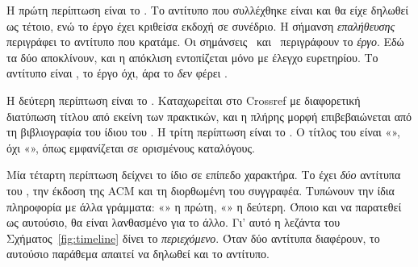 Η πρώτη περίπτωση είναι το \cite{berger2023simulation}. Το αντίτυπο που
συλλέχθηκε είναι  και θα είχε δηλωθεί ως τέτοιο, ενώ το έργο
έχει κριθείσα εκδοχή σε συνέδριο. Η σήμανση \emph{επαλήθευσης} περιγράφει
το αντίτυπο που κρατάμε. Οι σημάνσεις \prep\ και \grey\ περιγράφουν το
\emph{έργο}. Εδώ τα δύο αποκλίνουν, και η απόκλιση εντοπίζεται μόνο με
έλεγχο ευρετηρίου. Το αντίτυπο είναι , το έργο όχι, άρα το
\cite{berger2023simulation} \emph{δεν} φέρει \prep.

Η δεύτερη περίπτωση είναι το \cite{oki1988viewstamped}. Καταχωρείται στο
Crossref με διαφορετική διατύπωση τίτλου από εκείνη των πρακτικών, και η
πλήρης μορφή επιβεβαιώνεται από τη βιβλιογραφία του ίδιου του
\cite{lamport1998parttime}. Η τρίτη περίπτωση είναι το
\cite{jalalzai2023fasthotstuff}. Ο τίτλος του είναι «», όχι «», όπως εμφανίζεται σε
ορισμένους καταλόγους.

Μία τέταρτη περίπτωση δείχνει το ίδιο σε επίπεδο χαρακτήρα. Το
 έχει \emph{δύο} αντίτυπα του \cite{lamport1998parttime}, την
έκδοση της ACM και τη διορθωμένη του συγγραφέα. Τυπώνουν την ίδια
πληροφορία με άλλα γράμματα: «» η πρώτη, «» η
δεύτερη. Όποιο και να παρατεθεί ως αυτούσιο, θα είναι λανθασμένο για το
άλλο. Γι' αυτό η λεζάντα του Σχήματος~\ref{fig:timeline} δίνει το
\emph{περιεχόμενο}. Όταν δύο αντίτυπα διαφέρουν, το αυτούσιο παράθεμα
απαιτεί να δηλωθεί και το αντίτυπο.
